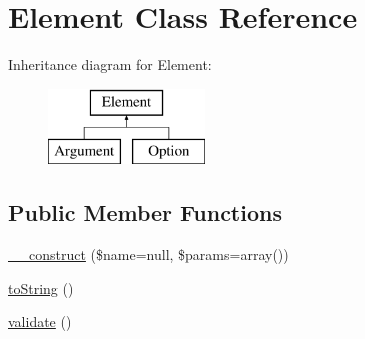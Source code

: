 \hypertarget{class_p_e_a_r2_1_1_console_1_1_command_line_1_1_element}{
\section{\-Element \-Class \-Reference}
\label{class_p_e_a_r2_1_1_console_1_1_command_line_1_1_element}
}
\-Inheritance diagram for \-Element\-:\begin{figure}[H]
\begin{center}
\leavevmode
\includegraphics[height=2.000000cm]{class_p_e_a_r2_1_1_console_1_1_command_line_1_1_element}
\end{center}
\end{figure}
\subsection*{\-Public \-Member \-Functions}
\begin{DoxyCompactItemize}
\item 
\hyperlink{class_p_e_a_r2_1_1_console_1_1_command_line_1_1_element_acce7c1c8eb94525cd672d1610bc1550e}{\-\_\-\-\_\-construct} (\$name=null, \$params=array())
\item 
\hyperlink{class_p_e_a_r2_1_1_console_1_1_command_line_1_1_element_a5558c5d549f41597377fa1ea8a1cefa3}{to\-String} ()
\item 
\hyperlink{class_p_e_a_r2_1_1_console_1_1_command_line_1_1_element_a184909dab34698899937d810a9f5d393}{validate} ()
\end{DoxyCompactItemize}
